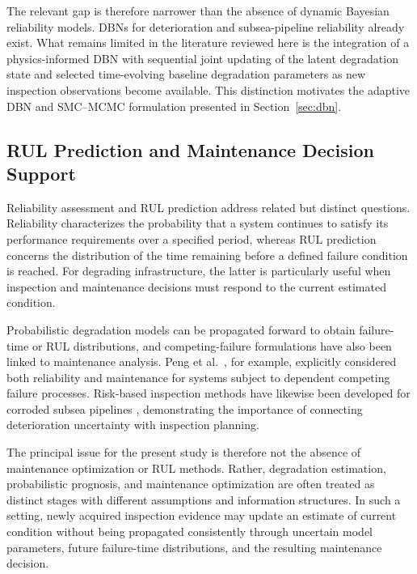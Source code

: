 \documentclass[journal]{IEEEtran}
\begin{document}
The relevant gap is therefore narrower than the absence of dynamic
Bayesian reliability models. DBNs for deterioration and subsea-pipeline
reliability already exist. What remains limited in the literature
reviewed here is the integration of a physics-informed DBN with
sequential joint updating of the latent degradation state and selected
time-evolving baseline degradation parameters as new inspection
observations become available. This distinction motivates the adaptive
DBN and SMC--MCMC formulation presented in
Section~\ref{sec:dbn}.



\subsection{RUL Prediction and Maintenance Decision Support}
\label{sec:lit_rul}

Reliability assessment and RUL prediction address related but distinct
questions. Reliability characterizes the probability that a system
continues to satisfy its performance requirements over a specified
period, whereas RUL prediction concerns the distribution of the time
remaining before a defined failure condition is reached. For degrading
infrastructure, the latter is particularly useful when inspection and
maintenance decisions must respond to the current estimated condition.

Probabilistic degradation models can be propagated forward to obtain
failure-time or RUL distributions, and competing-failure formulations
have also been linked to maintenance analysis. Peng
et al.~\cite{peng2010}, for example, explicitly considered both
reliability and maintenance for systems subject to dependent competing
failure processes. Risk-based inspection methods have likewise been
developed for corroded subsea pipelines \cite{seo2015}, demonstrating
the importance of connecting deterioration uncertainty with inspection
planning.


The principal issue for the present study is therefore not the absence
of maintenance optimization or RUL methods. Rather, degradation
estimation, probabilistic prognosis, and maintenance optimization are
often treated as distinct stages with different assumptions and
information structures. In such a setting, newly acquired inspection
evidence may update an estimate of current condition without being
propagated consistently through uncertain model parameters, future
failure-time distributions, and the resulting maintenance decision.
\end{document}

